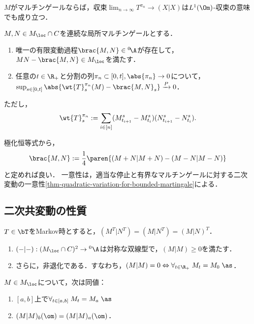\documentclass[uplatex,dvipdfmx]{jsreport}
\begin{document}
\begin{corollary}
    $M$がマルチンゲールならば，収束$\lim_{n\to\infty}T^{\pi_n}\to(X|X)$は$L^1(\Om)$-収束の意味でも成り立つ．
\end{corollary}

\begin{theorem}
    $M,N\in M_\loc\cap C$を連続な局所マルチンゲールとする．
    \begin{enumerate}
        \item 唯一の有限変動過程$\brac{M,N}\in{}^0\!\A$が存在して，$MN-\brac{M,N}\in M_\loc$を満たす．
        \item 任意の$t\in\R_+$と分割の列$\pi_n\subset[0,t],\abs{\pi_n}\to0$について，$\sup_{s\in[0,t]}\abs{\wt{T}_s^{\pi_n}(M)-\brac{M,N}_s}\xrightarrow{P}0$．
    \end{enumerate}
    ただし，
    \[\wt{T}_s^{\pi_n}:=\sum_{i\in[n]}(M^s_{t_{i+1}}-M^s_{t_i})(N^s_{t_{i+1}}-N^s_{t_i}).\]
\end{theorem}
\begin{Proof}
    極化恒等式から，
    \[\brac{M,N}:=\frac{1}{4}\paren{(M+N|M+N)-(M-N|M-N)}\]
    と定めれば良い．
    一意性は，適当な停止と有界なマルチンゲールに対する二次変動の一意性\ref{thm-quadratic-variation-for-bounded-martingale}による．
\end{Proof}

\subsection{二次共変動の性質}

\begin{proposition}
    $T\in\bT$をMarkov時とすると，$(M^T|N^T)=(M|N^T)=(M|N)^T$．
\end{proposition}

\begin{proposition}[内積を定める]\mbox{}
    \begin{enumerate}
        \item $(-|-):(M_\loc\cap C)^2\to{}^0\A$は対称な双線型で，$(M|M)\ge0$を満たす．
        \item さらに，非退化である．すなわち，$(M|M)=0\Leftrightarrow\forall_{t\in\R_+}\;M_t=M_0\;\as$．
    \end{enumerate}
\end{proposition}

\begin{proposition}[強い非退化性]
    $M\in M_\loc$について，次は同値：
    \begin{enumerate}
        \item $[a,b]$上で$\forall_{t\in[a,b]}\;M_t=M_a\;\as$
        \item $(M|M)_b(\om)=(M|M)_a(\om)$．
    \end{enumerate}
\end{proposition}
\end{document}
